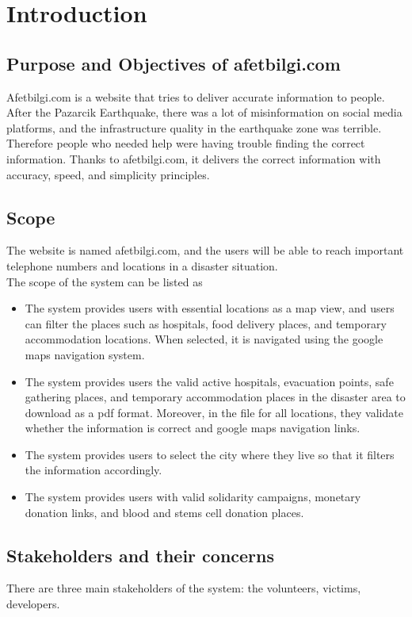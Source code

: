 \chapter{Introduction}

\section{Purpose and Objectives of afetbilgi.com}

Afetbilgi.com is a website that tries to deliver accurate information to people.
After the Pazarcik Earthquake, there was a lot of misinformation on social media platforms, and the infrastructure quality in the earthquake zone was terrible. 
Therefore people who needed help were having trouble finding the correct information.
Thanks to afetbilgi.com, it delivers the correct information with accuracy, speed, and simplicity principles.

\section{Scope}

The website is named afetbilgi.com, and the users will be able to reach important telephone numbers and locations in a disaster situation. \\
The scope of the system can be listed as \\
\begin{itemize}
    \item The system provides users with essential locations as a map view, and users can filter the places such as hospitals, food delivery places, and temporary accommodation locations. When selected, it is navigated using the google maps navigation system.
    \item The system provides users the valid active hospitals, evacuation points, safe gathering places, and temporary accommodation places in the disaster area to download as a pdf format. Moreover, in the file for all locations, they validate whether the information is correct and google maps navigation links.
    \item The system provides users to select the city where they live so that it filters the information accordingly.
    \item The system provides users with valid solidarity campaigns, monetary donation links, and blood and stems cell donation places. 
\end{itemize}

\section{Stakeholders and their concerns}

There are three main stakeholders of the system: the volunteers, victims, developers. \\

